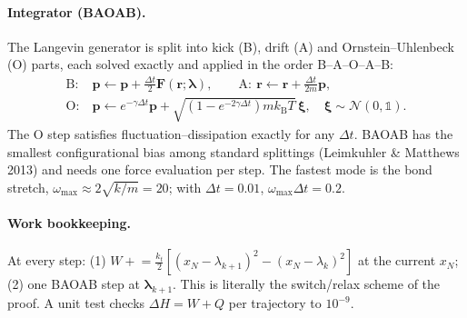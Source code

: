 \documentclass[11pt,a4paper]{article}
\newcommand{\kT}{k_{\mathrm B}T}
\newcommand{\lam}{\bm{\lambda}}
\begin{document}
\paragraph{Integrator (BAOAB).} The Langevin generator is split into kick (B), drift (A) and
Ornstein--Uhlenbeck (O) parts, each solved exactly and applied in the order B--A--O--A--B:
\begin{align*}
\text{B}:&\ \bm p\leftarrow\bm p+\tfrac{\Delta t}{2}\bm F(\bm r;\lam),\qquad
\text{A}:\ \bm r\leftarrow\bm r+\tfrac{\Delta t}{2m}\bm p,\\
\text{O}:&\ \bm p\leftarrow e^{-\gamma\Delta t}\bm p+\sqrt{(1-e^{-2\gamma\Delta t})m\kT}\,\bm\xi,
\quad \bm\xi\sim\mathcal N(0,\mathbb 1).
\end{align*}
The O step satisfies fluctuation--dissipation exactly for any $\Delta t$. BAOAB has the
smallest configurational bias among standard splittings (Leimkuhler \& Matthews 2013) and needs
one force evaluation per step. The fastest mode is the bond stretch, $\omega_{\max}\approx2\sqrt{k/m}=20$;
with $\Delta t=0.01$, $\omega_{\max}\Delta t=0.2$.

\paragraph{Work bookkeeping.} At every step: (1) $W\mathrel{+}=\tfrac{k_t}{2}[(x_N-\lambda_{k+1})^2-(x_N-\lambda_k)^2]$
at the current $x_N$; (2) one BAOAB step at $\lam_{k+1}$. This is literally the
switch/relax scheme of the proof. A unit test checks $\Delta H=W+Q$ per trajectory to $10^{-9}$.
\end{document}
